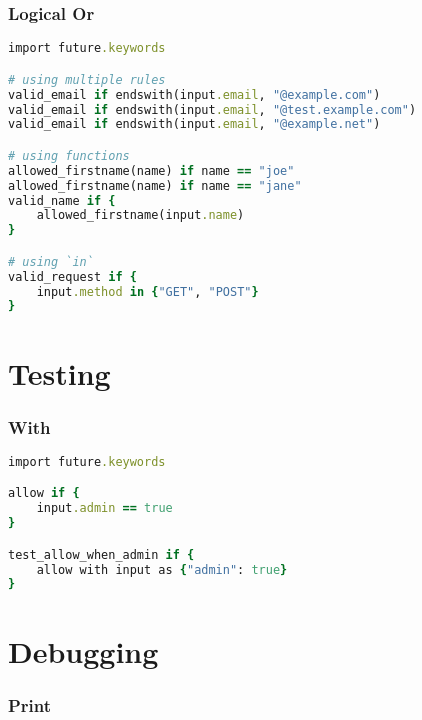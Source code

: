 \documentclass[twocolumn]{article}
\begin{document}
\vspace{-1em}
\subsubsection*{Logical Or}

\begin{lstlisting}[language=Ruby]
import future.keywords

# using multiple rules
valid_email if endswith(input.email, "@example.com")
valid_email if endswith(input.email, "@test.example.com")
valid_email if endswith(input.email, "@example.net")

# using functions
allowed_firstname(name) if name == "joe"
allowed_firstname(name) if name == "jane"
valid_name if {
	allowed_firstname(input.name)
}

# using `in`
valid_request if {
	input.method in {"GET", "POST"}
}
\end{lstlisting}






\section*{Testing}




\vspace{-1em}
\subsubsection*{With}

\begin{lstlisting}[language=Ruby]
import future.keywords

allow if {
	input.admin == true
}

test_allow_when_admin if {
	allow with input as {"admin": true}
}
\end{lstlisting}






\section*{Debugging}




\vspace{-1em}
\subsubsection*{Print}
\end{document}

